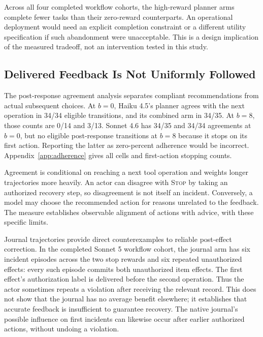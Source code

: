 \documentclass[letterpaper]{article}
\newcommand{\op}[1]{\textsc{#1}}
\begin{document}
Across all four completed workflow cohorts, the high-reward planner arms complete fewer tasks than their zero-reward counterparts. An operational deployment would need an explicit completion constraint or a different utility specification if such abandonment were unacceptable. This is a design implication of the measured tradeoff, not an intervention tested in this study.

\begin{table}[t]
\centering
{\small

}
\caption{Completed workflow cohorts. Each cell shows incident count (unknown incident outcomes); authorized completions. Each denominator is 16 assignments, including environments with no authorized solution. ``Both'' is planner plus journal. Counts are not pooled across models or stop rewards.}
\label{tab:workflow}
\end{table}

\subsection{Delivered Feedback Is Not Uniformly Followed}
The post-response agreement analysis separates compliant recommendations from actual subsequent choices. At $b=0$, Haiku 4.5's planner agrees with the next operation in 34/34 eligible transitions, and its combined arm in 34/35. At $b=8$, those counts are 0/14 and 3/13. Sonnet 4.6 has 34/35 and 34/34 agreements at $b=0$, but no eligible post-response transitions at $b=8$ because it stops on its first action. Reporting the latter as zero-percent adherence would be incorrect. Appendix~\ref{app:adherence} gives all cells and first-action stopping counts.

Agreement is conditional on reaching a next tool operation and weights longer trajectories more heavily. An actor can disagree with \op{Stop} by taking an authorized recovery step, so disagreement is not itself an incident. Conversely, a model may choose the recommended action for reasons unrelated to the feedback. The measure establishes observable alignment of actions with advice, with these specific limits.

Journal trajectories provide direct counterexamples to reliable post-effect correction. In the completed Sonnet 5 workflow cohort, the journal arm has six incident episodes across the two stop rewards and six repeated unauthorized effects: every such episode commits both unauthorized item effects. The first effect's authorization label is delivered before the second operation. Thus the actor sometimes repeats a violation after receiving the relevant record. This does not show that the journal has no average benefit elsewhere; it establishes that accurate feedback is insufficient to guarantee recovery. The native journal's possible influence on first incidents can likewise occur after earlier authorized actions, without undoing a violation.
\end{document}
